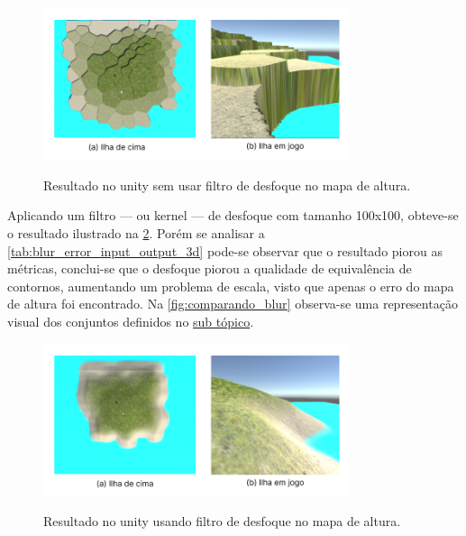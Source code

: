 \begin{figure}[!ht]
	\centering
    \caption{Resultado no unity sem usar filtro de desfoque no mapa de altura.}
	\includegraphics[width=0.8\textwidth]{figures/unity_entry.png}
	\label{fig:unity_init}
\end{figure}

Aplicando um filtro — ou kernel — de desfoque com tamanho 100x100, obteve-se o resultado ilustrado na \cref{fig:unity_blur}. Porém se analisar a \cref{tab:blur_error_input_output_3d} pode-se observar que o resultado piorou as métricas, conclui-se que o desfoque piorou a qualidade de equivalência de contornos, aumentando um problema de escala, visto que apenas o erro do mapa de altura foi encontrado. Na \cref{fig:comparando_blur} observa-se uma representação visual dos conjuntos definidos no \hyperref[sec:classificacao_conjuntos]{sub tópico}.

\begin{figure}[!ht]
	\centering
    \caption{Resultado no unity usando filtro de desfoque no mapa de altura.}
	\includegraphics[width=0.8\textwidth]{figures/unity_blur.png}
	\label{fig:unity_blur}
\end{figure}



